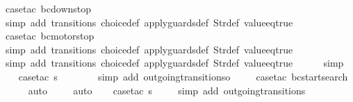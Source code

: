 \begin{isabellebody}
\ {\isacharparenleft}case{\isacharunderscore}tac\ {\isachardoublequoteopen}bc{\isacharequal}down{}{}stop{\isachardoublequoteclose}{\isacharparenright}\isanewline
\ \ \ \ \ \isamarkupfalse%
\ {\isacharparenleft}simp\ add{\isacharcolon}\ transitions\ choice{\isacharunderscore}def\ apply{\isacharunderscore}guards{\isacharunderscore}def\ Str{\isacharunderscore}def\ value{\isacharunderscore}eq{\isacharunderscore}true{\isacharparenright}\isanewline
\ \ \ \ \isamarkupfalse%
\ {\isacharparenleft}case{\isacharunderscore}tac\ {\isachardoublequoteopen}bc{\isacharequal}motorstop{}{\isachardoublequoteclose}{\isacharparenright}\isanewline
\ \ \ \ \ \isamarkupfalse%
\ {\isacharparenleft}simp\ add{\isacharcolon}\ transitions\ choice{\isacharunderscore}def\ apply{\isacharunderscore}guards{\isacharunderscore}def\ Str{\isacharunderscore}def\ value{\isacharunderscore}eq{\isacharunderscore}true{\isacharparenright}\isanewline
\ \ \ \ \isamarkupfalse%
\ {\isacharparenleft}simp\ add{\isacharcolon}\ transitions\ choice{\isacharunderscore}def\ apply{\isacharunderscore}guards{\isacharunderscore}def\ Str{\isacharunderscore}def\ value{\isacharunderscore}eq{\isacharunderscore}true{\isacharparenright}\isanewline
\ \ \ \ \isamarkupfalse%
\ simp\isanewline
\isanewline
\ \ \isamarkupfalse%
\ {\isacharparenleft}case{\isacharunderscore}tac\ {\isachardoublequoteopen}s{\isasymin}{\isacharbraceleft}{}{\isacharcomma}\ {}{\isacharcomma}\ {}{\isacharcomma}\ {}{\isacharbraceright}{\isachardoublequoteclose}{\isacharparenright}\isanewline
\ \ \ \isamarkupfalse%
\ {\isacharparenleft}simp\ add{\isacharcolon}\ outgoing{\isacharunderscore}transitions{\isacharunderscore}o{\isacharparenright}\isanewline
\ \ \ \isamarkupfalse%
\ {\isacharparenleft}case{\isacharunderscore}tac\ {\isachardoublequoteopen}bc{\isacharequal}startsearch{\isachardoublequoteclose}{\isacharparenright}\isanewline
\ \ \ \ \isamarkupfalse%
\ auto{\isacharbrackleft}{}{\isacharbrackright}\isanewline
\ \ \ \isamarkupfalse%
\ auto{\isacharbrackleft}{}{\isacharbrackright}\isanewline
\isanewline
\ \ \isamarkupfalse%
\ {\isacharparenleft}case{\isacharunderscore}tac\ {\isachardoublequoteopen}s{\isacharequal}{}{\isachardoublequoteclose}{\isacharparenright}\isanewline
\ \ \ \isamarkupfalse%
\ {\isacharparenleft}simp\ add{\isacharcolon}\ outgoing{\isacharunderscore}transitions{\isacharunderscore}{}{\isacharparenright}\isanewline

\end{isabellebody}
